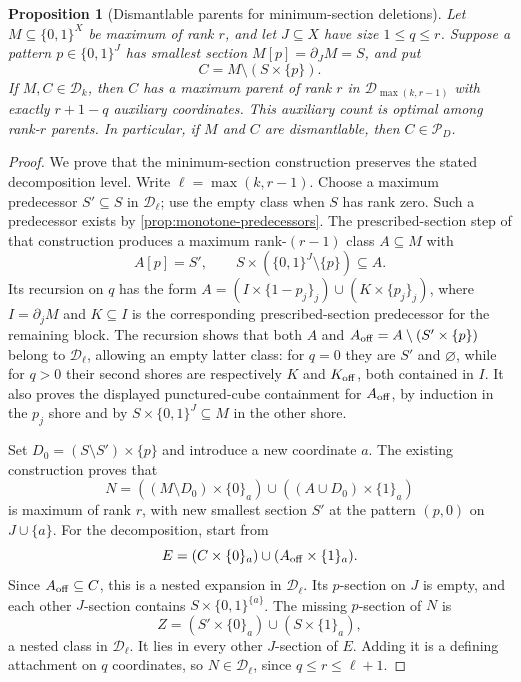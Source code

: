 \documentclass[11pt]{article}
\newtheorem{proposition}{Proposition}[section]
\theoremstyle{definition}
\newcommand{\bits}{\{0,1\}}
\begin{document}
\begin{proposition}[Dismantlable parents for minimum-section deletions]
\label{thm:dismantlable-minimum-deletion}
Let $M\subseteq\bits^X$ be maximum of rank $r$, and let $J\subseteq X$
have size $1\le q\le r$. Suppose a pattern $p\in\bits^J$ has smallest
section $M[p]=\partial_JM=S$, and put
\[
 C=M\setminus(S\times\{p\}).
\]
If $M,C\in\mathcal D_k$, then $C$ has a maximum parent of rank $r$
in $\mathcal D_{\max(k,r-1)}$ with exactly $r+1-q$ auxiliary coordinates.
This auxiliary count is optimal among rank-$r$ parents.
In particular, if $M$ and $C$ are dismantlable, then
$C\in\mathcal P_D$.
\end{proposition}
\begin{proof}
We prove that the minimum-section construction
\cite[Theorem~\textnormal{Deleting a smallest coordinate section}]{MaxParents}
preserves the stated decomposition level. Write $\ell=\max(k,r-1)$.
Choose a maximum predecessor $S'\subseteq S$ in $\mathcal D_\ell$;
use the empty class when $S$ has rank zero. Such a predecessor exists
by \cref{prop:monotone-predecessors}. The prescribed-section step of
that construction produces a maximum rank-$(r-1)$ class $A\subseteq M$
with
\[
 A[p]=S',\qquad
 S\times(\bits^J\setminus\{p\})\subseteq A.
\]
Its recursion on $q$ has the form
$A=(I\times\{1-p_j\}_j)\cup(K\times\{p_j\}_j)$,
where $I=\partial_jM$ and $K\subseteq I$ is the corresponding
prescribed-section predecessor for the remaining block.
The recursion shows that both $A$ and
$A_{\rm off}=A\setminus(S'\times\{p\})$ belong to
$\mathcal D_\ell$, allowing an empty latter class: for $q=0$ they
are $S'$ and $\varnothing$, while for $q>0$ their second shores
are respectively $K$ and $K_{\rm off}$, both contained in $I$.
It also proves the displayed punctured-cube containment for
$A_{\rm off}$, by induction in the $p_j$ shore and by
$S\times\bits^J\subseteq M$ in the other shore.

Set $D_0=(S\setminus S')\times\{p\}$ and introduce a new coordinate $a$.
The existing construction proves that
\[
 N=((M\setminus D_0)\times\{0\}_a)
       \cup((A\cup D_0)\times\{1\}_a)
\]
is maximum of rank $r$, with new smallest section $S'$ at the
pattern $(p,0)$ on $J\cup\{a\}$. For the decomposition, start from
\[
 E=(C\times\{0\}_a)\cup(A_{\rm off}\times\{1\}_a).
\]
Since $A_{\rm off}\subseteq C$, this is a nested expansion in
$\mathcal D_\ell$. Its $p$-section on $J$ is empty, and each other
$J$-section contains $S\times\bits^{\{a\}}$.
The missing $p$-section of $N$ is
\[
 Z=(S'\times\{0\}_a)\cup(S\times\{1\}_a),
\]
a nested class in $\mathcal D_\ell$. It lies in every other
$J$-section of $E$. Adding it is a defining attachment on $q$
coordinates, so $N\in\mathcal D_\ell$, since $q\le r\le\ell+1$.


\end{proof}
\end{document}
